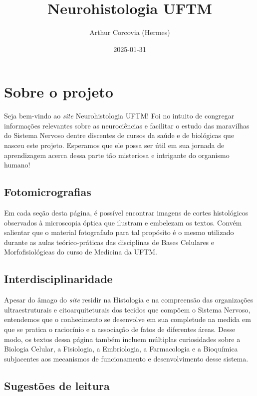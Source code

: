 \documentclass[
]{book}
\title{Neurohistologia UFTM}
\author{Arthur Corcovia (Hermes)}
\date{2025-01-31}
\begin{document}
\maketitle

{
\setcounter{tocdepth}{1}
\tableofcontents
}
\hypertarget{sobre-o-projeto}{%
\chapter{Sobre o projeto}\label{sobre-o-projeto}}

Seja bem-vindo ao \emph{site} Neurohistologia UFTM! Foi no intuito de congregar informações relevantes sobre as neurociências e facilitar o estudo das maravilhas do Sistema Nervoso dentre discentes de cursos da saúde e de biológicas que nasceu este projeto. Esperamos que ele possa ser útil em sua jornada de aprendizagem acerca dessa parte tão misteriosa e intrigante do organismo humano!

\hypertarget{fotomicrografias}{%
\section{Fotomicrografias}\label{fotomicrografias}}

Em cada seção desta página, é possível encontrar imagens de cortes histológicos observados à microscopia óptica que ilustram e embelezam os textos. Convém salientar que o material fotografado para tal propósito é o mesmo utilizado durante as aulas teórico-práticas das disciplinas de Bases Celulares e Morfofisiológicas do curso de Medicina da UFTM.

\hypertarget{interdisciplinaridade}{%
\section{Interdisciplinaridade}\label{interdisciplinaridade}}

Apesar do âmago do \emph{site} residir na Histologia e na compreensão das organizações ultraestruturais e citoarquiteturais dos tecidos que compõem o Sistema Nervoso, entendemos que o conhecimento se desenvolve em sua completude na medida em que se pratica o raciocínio e a associação de fatos de diferentes áreas. Desse modo, os textos dessa página também incluem múltiplas curiosidades sobre a Biologia Celular, a Fisiologia, a Embriologia, a Farmacologia e a Bioquímica subjacentes aos mecanismos de funcionamento e desenvolvimento desse sistema.

\hypertarget{sugestuxf5es-de-leitura}{%
\section{Sugestões de leitura}\label{sugestuxf5es-de-leitura}}
\end{document}
